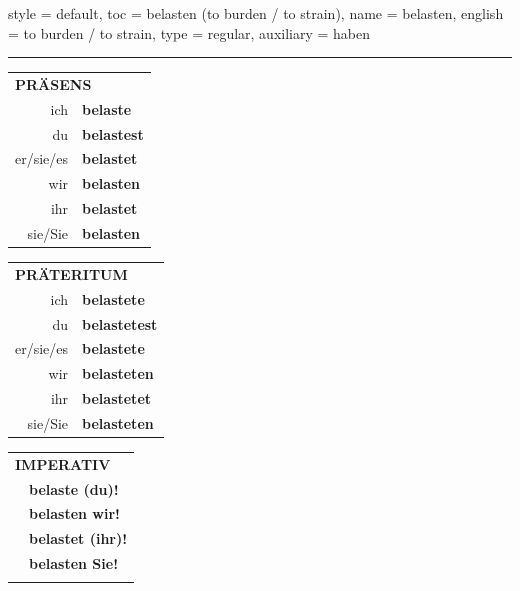 \begin{verbentry}{
  style = {default},
  toc = {belasten (to burden / to strain)},
  name = {belasten},
  english = {to burden / to strain},
  type = {regular},
  auxiliary = {haben}
}
 
    
     \vspace{5pt}

    \hrule
    
    \vspace{5pt}

  \begin{tabular}{rl}
     \multicolumn{2}{l}{\textbf{PRÄSENS} }\\
    ich & \textbf{belaste}\\
    du & \textbf{belastest}\\
    er/sie/es & \textbf{belastet}\\
    wir & \textbf{belasten}\\
    ihr & \textbf{belastet}\\
    sie/Sie & \textbf{belasten}\\
  \end{tabular}
  \hfill
     \begin{tabular}{rl}
    \multicolumn{2}{l}{\textbf{PRÄTERITUM} }\\
    ich & \textbf{belastete}\\
    du & \textbf{belastetest}\\
    er/sie/es & \textbf{belastete}\\
    wir & \textbf{belasteten}\\
    ihr & \textbf{belastetet}\\
    sie/Sie & \textbf{belasteten}\\
  \end{tabular}
  \hfill
  \begin{tabular}{rl}
     \multicolumn{2}{l}{\textbf{IMPERATIV} }\\
   & \textbf{belaste (du)!}\\
   & \textbf{belasten wir!}\\
   & \textbf{belastet (ihr)!}\\
   & \textbf{belasten Sie!}\\
   & \vspace{10pt}
  \end{tabular}

    \vspace{10pt}


\end{verbentry}
